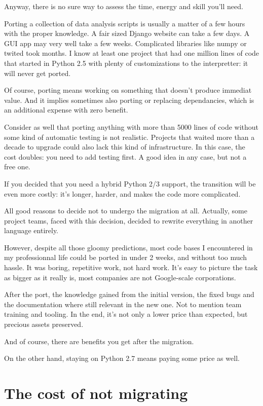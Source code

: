 Anyway, there is no sure way to assess the time, energy and skill you'll need.

Porting a collection of data analysis scripts is usually a matter of a few hours with the proper knowledge. A fair sized Django website can take a few days. A GUI app may very well take a few weeks. Complicated libraries like numpy or twited took months. I know at least one project that had one million lines of code that started in Python 2.5 with plenty of customizations to the interpretter: it will never get ported.

Of course, porting means working on something that doesn't produce immediat value. And it implies sometimes also porting or replacing dependancies, which is an additional expense with zero benefit.

Consider as well that porting anything with more than 5000 lines of code without some kind of automatic testing is not realistic. Projects that waited more than a decade to upgrade could also lack this kind of infrastructure. In this case, the cost doubles: you need to add testing first. A good idea in any case, but not a free one.

If you decided that you need a hybrid Python 2/3 support, the transition will be even more costly: it's longer, harder, and makes the code more complicated.

All good reasons to decide not to undergo the migration at all. Actually, some project teams, faced with this decision, decided to rewrite everything in another language entirely.

However, despite all those gloomy predictions, most code bases I encountered in my professionnal life could be ported in under 2 weeks, and without too much hassle. It was boring, repetitive work, not hard work. It's easy to picture the task as bigger as it really is, most companies are not Google-scale corporations.

After the port, the knowledge gained from the initial version, the fixed bugs and the documentation where still relevant in the new one. Not to mention team training and tooling. In the end, it's not only a lower price than expected, but precious assets preserved.

And of course, there are benefits you get after the migration.

On the other hand, staying on Python 2.7 means paying some price as well.

\section{The cost of not migrating}

